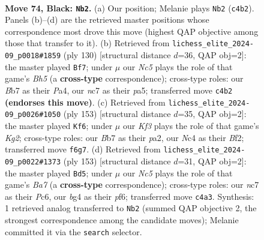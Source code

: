 \documentclass[11pt]{article}
\begin{document}
\clearpage

\begin{figure}[p]\centering
\begin{subfigure}{0.46\textwidth}\centering
\resizebox{\linewidth}{!}{%
\newchessgame
\chessboard[
  setfen={8/PbN5/5k2/8/1pn2PB1/6P1/4K2P/3R4 b - - 17 74},
  showmover=false,
  pgfstyle=straightmove, color=movearrow, markmove={c4-b2}
]}
\caption{}
\end{subfigure}\hfill
\begin{subfigure}{0.46\textwidth}\centering
\resizebox{\linewidth}{!}{%
\newchessgame
\chessboard[
  setfen={8/8/1p6/p6B/P4p1b/1P4k1/8/5K2 w - - 0 66},
  showmover=false,
  pgfstyle=straightmove, color=movearrow, markmove={h5-f7}
]}
\caption{}
\end{subfigure}
\\[4pt]
\begin{subfigure}{0.46\textwidth}\centering
\resizebox{\linewidth}{!}{%
\newchessgame
\chessboard[
  setfen={8/6k1/4B3/p7/5p2/5P1K/P4bP1/8 b - - 41 77},
  showmover=false,
  pgfstyle=straightmove, color=movearrow, markmove={g7-f6}
]}
\caption{}
\end{subfigure}\hfill
\begin{subfigure}{0.46\textwidth}\centering
\resizebox{\linewidth}{!}{%
\newchessgame
\chessboard[
  setfen={4k3/6K1/p1p2P2/8/1P6/2BP4/b1P5/8 b - - 0 77},
  showmover=false,
  pgfstyle=straightmove, color=movearrow, markmove={a2-d5}
]}
\caption{}
\end{subfigure}
\caption{\textbf{Move 74, Black: \texttt{Nb2}.} (a) Our position; Melanie plays \texttt{Nb2} (\texttt{c4b2}). Panels (b)--(d) are the retrieved master positions whose correspondence most drove this move (highest QAP objective among those that transfer to it). (b) Retrieved from \texttt{lichess\_elite\_2024-09\_p0018\#1859} (ply 130) [structural distance $d$=36, QAP obj=2]: the master played \texttt{Bf7}; under $\mu$ our \emph{Nc5} plays the role of that game's \emph{Bh5} (a \textbf{cross-type} correspondence); cross-type roles: our \emph{B}b7 as their \emph{P}a4, our \emph{n}c7 as their \emph{p}a5; transferred move \texttt{c4b2} \textbf{(endorses this move)}. (c) Retrieved from \texttt{lichess\_elite\_2024-09\_p0026\#1050} (ply 153) [structural distance $d$=35, QAP obj=2]: the master played \texttt{Kf6}; under $\mu$ our \emph{Kf3} plays the role of that game's \emph{Kg2}; cross-type roles: our \emph{B}b7 as their \emph{p}a2, our \emph{N}c4 as their \emph{B}f2; transferred move \texttt{f6g7}. (d) Retrieved from \texttt{lichess\_elite\_2024-09\_p0022\#1373} (ply 153) [structural distance $d$=31, QAP obj=2]: the master played \texttt{Bd5}; under $\mu$ our \emph{Nc5} plays the role of that game's \emph{Ba7} (a \textbf{cross-type} correspondence); cross-type roles: our \emph{n}c7 as their \emph{P}c6, our \emph{b}g4 as their \emph{p}f6; transferred move \texttt{c4a3}. Synthesis: 1 retrieved analog transferred to \texttt{Nb2} (summed QAP objective 2, the strongest correspondence among the candidate moves); Melanie committed it via the \texttt{search} selector.}
\label{fig:thought-m147}
\end{figure}
\end{document}
